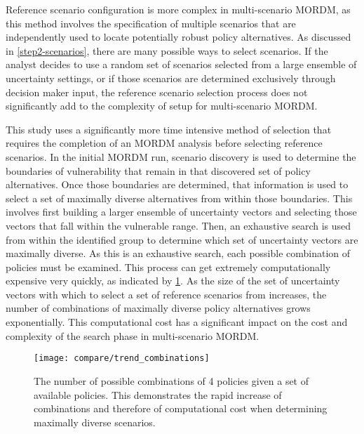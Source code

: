     Reference scenario configuration is more complex in multi-scenario MORDM, as this method involves the specification of multiple scenarios that are independently used to locate potentially robust policy alternatives. As discussed in \cref{step2-scenarios}, there are many possible ways to select scenarios. If the analyst decides to use a random set of scenarios selected from a large ensemble of uncertainty settings, or if those scenarios are determined exclusively through decision maker input, the reference scenario selection process does not significantly add to the complexity of setup for multi-scenario MORDM. 
    
    This study uses a significantly more time intensive method of selection that requires the completion of an MORDM analysis before selecting reference scenarios. In the initial MORDM run, scenario discovery is used to determine the boundaries of vulnerability that remain in that discovered set of policy alternatives. Once those boundaries are determined, that information is used to select a set of maximally diverse alternatives from within those boundaries. This involves first building a larger ensemble of uncertainty vectors and selecting those vectors that fall within the vulnerable range. Then, an exhaustive search is used from within the identified group to determine which set of uncertainty vectors are maximally diverse. As this is an exhaustive search, each possible combination of policies must be examined. This process can get extremely computationally expensive very quickly, as indicated by \cref{fig:trend-policycombinations}. As the size of the set of uncertainty vectors with which to select a set of reference scenarios from increases, the number of combinations of maximally diverse policy alternatives grows exponentially. This computational cost has a significant impact on the cost and complexity of the search phase in multi-scenario MORDM. 
    
    \begin{figure}[ht]
        \centering
        \captionsetup{width=0.5\textwidth}
        
        \texttt{[image: compare/trend\_combinations]}
        \caption[Trend in computational cost when selecting maximally diverse policies]{The number of possible combinations of 4 policies given a set of available policies. This demonstrates the rapid increase of combinations and therefore of computational cost when determining maximally diverse scenarios.}
        \label{fig:trend-policycombinations}
    \end{figure}

